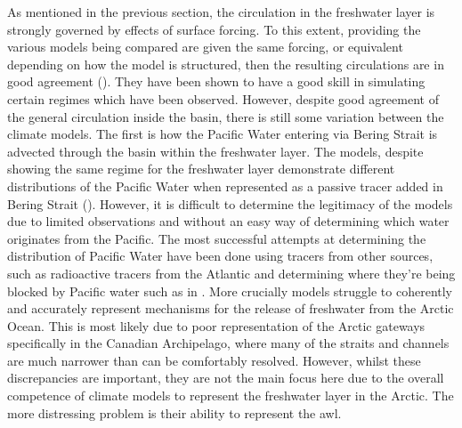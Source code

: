 \documentclass[12pt,a4paper]{report}
\begin{document}
As mentioned in the previous section, the circulation in the freshwater layer is strongly
 governed by effects of surface forcing. To this extent, providing the various models being
  compared are given the same forcing, or equivalent depending on how the model is
   structured, then the resulting circulations are in good agreement
    (\cite{proshutinsky2005arctic}). They have been shown to have a good skill in simulating
     certain regimes which have been observed. However, despite good agreement of the general
      circulation inside the basin, there is still some variation between the climate models.
       The first is how the Pacific Water entering via Bering Strait is advected through the
    basin within the freshwater layer. The models, despite showing the same regime for the
     freshwater layer demonstrate different distributions of the Pacific Water when
      represented as a passive tracer added in Bering Strait (\cite{proshutinsky2011recent}).
       However, it is difficult to
       determine the legitimacy of the models
       due to limited observations and without an easy way of determining which water originates from the Pacific. The
     most successful attempts at determining the distribution of Pacific Water have been
     done using tracers from other sources, such as radioactive tracers from the Atlantic and
      determining where they're being blocked by Pacific water such as in \cite{karcher2004dispersion}. More crucially models struggle to coherently and accurately represent
    mechanisms for the release of freshwater from the Arctic Ocean. This is most likely
     due to poor representation of the Arctic gateways specifically in the Canadian
      Archipelago, where many of the straits and channels are much narrower than can be
   comfortably resolved. However, whilst these discrepancies are important, they are
    not the main focus here due to the overall competence of climate models to
 represent the freshwater layer in the Arctic. The more distressing problem is
  their ability to represent the \gls{awl}. 
\end{document}
